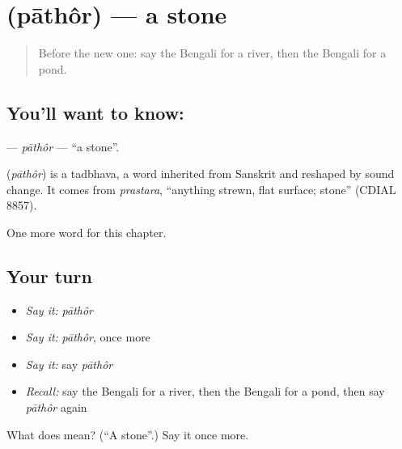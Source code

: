 \section[\texorpdfstring{\bn{পাথর} (pāthôr)}{পাথর (pāthôr)}]{ (pāthôr) — a stone}

\label{lesson:BN-C66-pathor}



\begin{quote}
Before the new one: say the Bengali for a river, then the Bengali for a pond.
\end{quote}

\subsection*{You'll want to know: }
\textbf{} — \emph{pāthôr} — \textquotedblleft{}a stone\textquotedblright{}.

\begin{cousinweb}
\textbf{} (\emph{pāthôr}) is a tadbhava, a word inherited from Sanskrit and reshaped by sound change. It comes from \emph{prastara}, \textquotedblleft{}anything strewn, flat surface; stone\textquotedblright{} (CDIAL 8857).
\end{cousinweb}

\begin{grammarlens}[title={What you've built}]
One more word for this chapter.
\end{grammarlens}

\subsection*{Your turn}
\begin{itemize}
\raggedright
  \item \emph{Say it:} \emph{pāthôr}
  \item \emph{Say it:} \emph{pāthôr}, once more
  \item \emph{Say it:} say \emph{pāthôr}
  \item \emph{Recall:} say the Bengali for a river, then the Bengali for a pond, then say \emph{pāthôr} again
\end{itemize}

\begin{tcolorbox}[breakable,colback=teal!4,colframe=teal!35!black,title={Before you move on}]
What does  mean? (\textquotedblleft{}A stone\textquotedblright{}.) Say it once more.
\end{tcolorbox}
